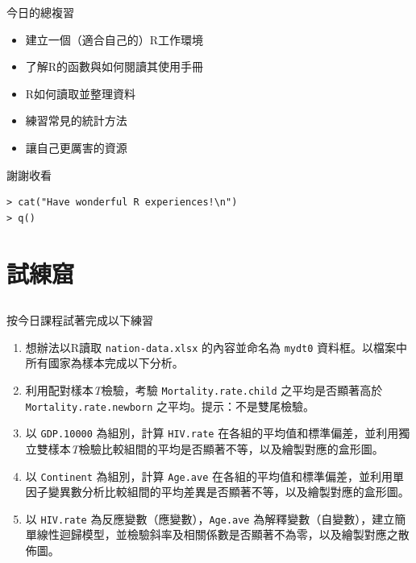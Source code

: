 \documentclass[14pt, aspectratio=43]{beamer}
\begin{document}
\begin{frame}{今日的總複習}
\begin{itemize}
\item 建立一個（適合自己的）R工作環境
\item 了解R的函數與如何閱讀其使用手冊
\item R如何讀取並整理資料
\item 練習常見的統計方法
\item 讓自己更厲害的資源
\end{itemize}
\end{frame}

\begin{frame}[fragile]{謝謝收看}
\large
\begin{verbatim}
> cat("Have wonderful R experiences!\n")
> q()
\end{verbatim}

\end{frame}



\section{試練窟}\subsection{}

\begin{frame}[shrink=8, fragile]{按今日課程試著完成以下練習}
\begin{enumerate}
\item 想辦法以R讀取 \verb+nation-data.xlsx+ 的內容並命名為 \verb+mydt0+ 資料框。以檔案中所有國家為樣本完成以下分析。
\item 利用配對樣本\emph{T}檢驗，考驗 \verb+Mortality.rate.child+ 之平均是否顯著高於 \verb+Mortality.rate.newborn+ 之平均。提示：不是雙尾檢驗。
\item 以 \verb+GDP.10000+ 為組別，計算 \verb+HIV.rate+ 在各組的平均值和標準偏差，並利用獨立雙樣本\emph{T}檢驗比較組間的平均是否顯著不等，以及繪製對應的盒形圖。
\item 以 \verb+Continent+ 為組別，計算 \verb+Age.ave+ 在各組的平均值和標準偏差，並利用單因子變異數分析比較組間的平均差異是否顯著不等，以及繪製對應的盒形圖。
\item 以 \verb+HIV.rate+ 為反應變數（應變數），\verb+Age.ave+ 為解釋變數（自變數），建立簡單線性迴歸模型，並檢驗斜率及相關係數是否顯著不為零，以及繪製對應之散佈圖。
\end{enumerate}
\end{frame}
\end{document}
